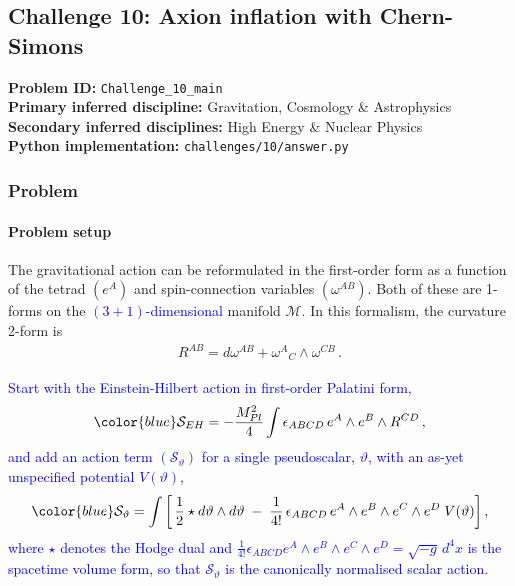 \subsection[Challenge 10: Axion inflation with Chern-Simons]{Challenge 10: Axion inflation with Chern-Simons}
\textbf{Problem ID:} \texttt{Challenge\_10\_main}\\
\textbf{Primary inferred discipline:} Gravitation, Cosmology \& Astrophysics\\
\textbf{Secondary inferred disciplines:} High Energy \& Nuclear Physics\\
\textbf{Python implementation:} \texttt{challenges/10/answer.py}

\subsubsection*{Problem}
\paragraph*{Problem setup}


The gravitational action can be reformulated in the first-order form as a function of the tetrad $(e^A)$ and spin-connection variables $(\omega^{AB})$. Both of these are 1-forms on the \textcolor{blue}{$(3+1)$-dimensional} manifold $\mathcal{M}$. In this formalism, the curvature 2-form is
\begin{align}
R^{AB} =d\omega^{AB} + \omega^A{}_C\wedge\omega^{CB}\,.
\end{align}

\textcolor{blue}{Start with the Einstein-Hilbert action in first-order Palatini form,}
\begin{align}
{\color{blue}
\mathcal{S}_{EH} = -\frac{M_{Pl}^{2}}{4}\int \epsilon_{ABCD}\, e^A\wedge e^B\wedge R^{CD}\,,}
\end{align}
\textcolor{blue}{and add an action term $(\mathcal{S}_{\vartheta})$ for a single pseudoscalar, $\vartheta$, with an as-yet unspecified potential $V(\vartheta)$,}
\begin{align}
{\color{blue}
\mathcal{S}_{\vartheta} = \int \left[\, \frac{1}{2}\star d\vartheta\wedge d\vartheta \;-\; \frac{1}{4!}\,\epsilon_{ABCD}\, e^A\wedge e^B\wedge e^C\wedge e^D\; V(\vartheta) \right],}
\end{align}
\textcolor{blue}{where $\star$ denotes the Hodge dual and $\tfrac{1}{4!}\epsilon_{ABCD}e^A\wedge e^B\wedge e^C\wedge e^D = \sqrt{-g}\,d^4x$ is the spacetime volume form, so that $\mathcal{S}_{\vartheta}$ is the canonically normalised scalar action.}


